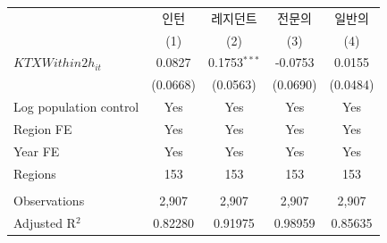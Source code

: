 \begingroup
\centering
\begin{tabular}{lcccc}
   \toprule
                          & 인턴     & 레지던트       & 전문의   & 일반의 \\   
                          & (1)      & (2)            & (3)      & (4)\\  
   \midrule 
   $KTXWithin2h_{it}$     & 0.0827   & 0.1753$^{***}$ & -0.0753  & 0.0155\\   
                          & (0.0668) & (0.0563)       & (0.0690) & (0.0484)\\   
   Log population control & Yes      & Yes            & Yes      & Yes\\  
   Region FE              & Yes      & Yes            & Yes      & Yes\\  
   Year FE                & Yes      & Yes            & Yes      & Yes\\  
   Regions                & 153      & 153            & 153      & 153\\  
    \\
   Observations           & 2,907    & 2,907          & 2,907    & 2,907\\  
   Adjusted R$^2$         & 0.82280  & 0.91975        & 0.98959  & 0.85635\\  
   \bottomrule
\end{tabular}
\par\endgroup
